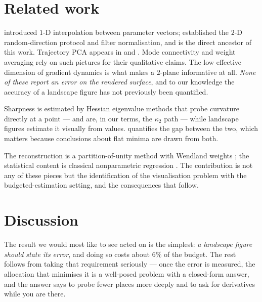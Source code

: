 \documentclass[11pt]{article}
\theoremstyle{definition}
\begin{document}
\section{Related work}
\label{sec:related}

\citet{goodfellow2015qualitatively} introduced $1$-D interpolation between parameter
vectors; \citet{li2018visualizing} established the $2$-D random-direction protocol and
filter normalisation, and is the direct ancestor of this work. Trajectory PCA appears in
\citet{li2018visualizing} and \citet{fort2019emergent}. Mode connectivity
\citep{garipov2018loss,draxler2018essentially} and weight averaging
\citep{izmailov2018averaging} rely on such pictures for their qualitative claims. The
low effective dimension of gradient dynamics \citep{gurari2018gradient,sagun2018empirical}
is what makes a $2$-plane informative at all. \emph{None of these report an error on the
rendered surface}, and to our knowledge the accuracy of a landscape figure has not
previously been quantified.

Sharpness is estimated by Hessian eigenvalue methods
\citep{ghorbani2019investigation,yao2020pyhessian} that probe curvature directly at a
point --- and are, in our terms, the $\kappa_2$ path --- while landscape figures
estimate it visually from values.  quantifies the gap between the two,
which matters because conclusions about flat minima
\citep{keskar2017large,dinh2017sharp,foret2021sharpness} are drawn from both.

The reconstruction is a partition-of-unity method \citep{babuska1997partition} with
Wendland weights \citep{wendland1995piecewise}; the statistical content is classical
nonparametric regression \citep{stone1980optimal,fan1996local,tsybakov2009introduction}.
The contribution is not any of these pieces but the identification of the visualisation
problem with the budgeted-estimation setting, and the consequences that follow.

\section{Discussion}
\label{sec:discussion}

The result we would most like to see acted on is the simplest: \emph{a landscape figure
should state its error}, and doing so costs about $6\%$ of the budget. The rest follows
from taking that requirement seriously --- once the error is measured, the allocation
that minimises it is a well-posed problem with a closed-form answer, and the answer says
to probe fewer places more deeply and to ask for derivatives while you are there.
\end{document}

